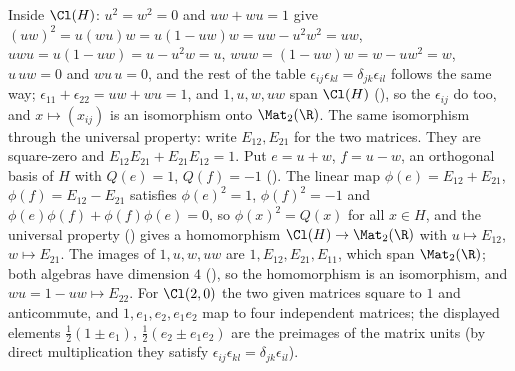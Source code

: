 Inside $\Cl(H)$: $u^{2} = w^{2} = 0$ and $uw + wu = 1$ give $(uw)^{2} = u(wu)w = u(1 - uw)w = uw - u^{2}w^{2} = uw$, $uwu = u(1 - uw) = u - u^{2}w = u$, $wuw = (1 - uw)w = w - uw^{2} = w$, $u\,uw = 0$ and $wu\,u = 0$, and the rest of the table $\epsilon_{ij}\epsilon_{kl} = \delta_{jk}\epsilon_{il}$ follows the same way; $\epsilon_{11} + \epsilon_{22} = uw + wu = 1$, and $1, u, w, uw$ span $\Cl(H)$ (), so the $\epsilon_{ij}$ do too, and $x \mapsto (x_{ij})$ is an isomorphism onto $\Mat_2(\R)$. The same isomorphism through the universal property: write $E_{12}, E_{21}$ for the two matrices. They are square-zero and $E_{12}E_{21} + E_{21}E_{12} = 1$. Put $e = u + w$, $f = u - w$, an orthogonal basis of $H$ with $Q(e) = 1$, $Q(f) = -1$ (). The linear map $\phi(e) = E_{12} + E_{21}$, $\phi(f) = E_{12} - E_{21}$ satisfies $\phi(e)^{2} = 1$, $\phi(f)^{2} = -1$ and $\phi(e)\phi(f) + \phi(f)\phi(e) = 0$, so $\phi(x)^{2} = Q(x)$ for all $x \in H$, and the universal property () gives a homomorphism $\Cl(H) \to \Mat_2(\R)$ with $u \mapsto E_{12}$, $w \mapsto E_{21}$. The images of $1, u, w, uw$ are $1, E_{12}, E_{21}, E_{11}$, which span $\Mat_2(\R)$; both algebras have dimension $4$ (), so the homomorphism is an isomorphism, and $wu = 1 - uw \mapsto E_{22}$. For $\Cl(2,0)$ the two given matrices square to $1$ and anticommute, and $1, e_1, e_2, e_1e_2$ map to four independent matrices; the displayed elements $\tfrac12(1 \pm e_1)$, $\tfrac12(e_2 \pm e_1e_2)$ are the preimages of the matrix units (by direct multiplication they satisfy $\epsilon_{ij}\epsilon_{kl} = \delta_{jk}\epsilon_{il}$).
